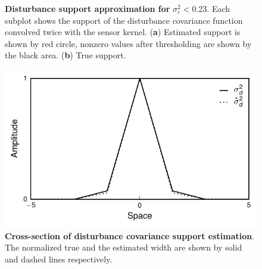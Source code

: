\documentclass[]{article}
\begin{document}
\begin{figure}[!ht]
\begin{center}
\end{center}
\caption{{\bf Disturbance support approximation for }$\sigma_{\varepsilon}^2<$0.23. Each subplot shows the support of the disturbance covariance function convolved twice with the sensor kernel. (\textbf{a}) Estimated support is shown by red circle, nonzero values after thresholding are shown by the black area. (\textbf{b}) True support.}
\label{fig:BinaryDisturbanceWidthEstimation}
\end{figure}
\begin{figure}[!ht]
\begin{center}
\centering
\includegraphics[scale=1]{./Figures/DisturbanceWidthEstimationCrossSection.pdf}
\end{center}
\caption{{\bf Cross-section of disturbance covariance support estimation}. The normalized true and the estimated width are shown by solid and dashed lines respectively.}
\label{fig:DisturbanceWidthEstimationCrossSection}
\end{figure}
\end{document}
